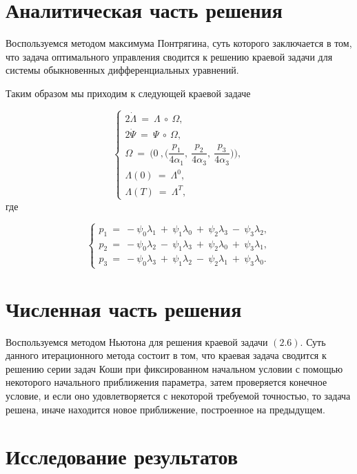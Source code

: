 \documentclass[14pt]{extreport}
\begin{document}
\section{Аналитическая часть решения}

Воспользуемся методом максимума Понтрягина, суть которого заключается в том, что задача оптимального управления сводится к решению краевой задачи
для системы обыкновенных дифференциальных уравнений.

Таким образом мы приходим к следующей краевой задаче

\begin{equation}
\begin{cases}
2\dot{\Lambda}\ =\ \Lambda\ \circ\ \Omega, \\
2\dot{\Psi}\ =\ \Psi\ \circ\ \Omega, \\
\Omega\ =\ \bigg(0\ ,\bigg(\dfrac{p_1}{4\alpha_1},\ \dfrac{p_2}{4\alpha_3},\ \dfrac{p_3}{4\alpha_3}\bigg) \bigg), \\
\Lambda(0)\ =\ \Lambda^0, \\
\Lambda(T)\ =\ \Lambda^T,
 \end{cases}
\end{equation}
где 

\begin{equation}
\begin{cases}
p_1\ =\ - \psi_0\lambda_1\ +\ \psi_1\lambda_0\ +\ \psi_2\lambda_3\ -\ \psi_3\lambda_2, \\
p_2\ =\ - \psi_0\lambda_2\ -\ \psi_1\lambda_3\ +\ \psi_2\lambda_0\ +\ \psi_3\lambda_1, \\
p_3\ =\ - \psi_0\lambda_3\ +\ \psi_1\lambda_2\ -\ \psi_2\lambda_1\ +\ \psi_3\lambda_0.
 \end{cases}
\end{equation}

\section{Численная часть решения}

Воспользуемся методом Ньютона для решения краевой задачи $(2.6)$. Суть данного итерационного метода состоит в том, что краевая задача сводится
к решению серии задач Коши при фиксированном начальном условии с помощью некоторого начального приближения параметра,
затем проверяется конечное условие, и если оно удовлетворяется с некоторой требуемой точностью, то задача решена, иначе находится новое приближение,
построенное на предыдущем.

\section{Исследование результатов}
\end{document}
